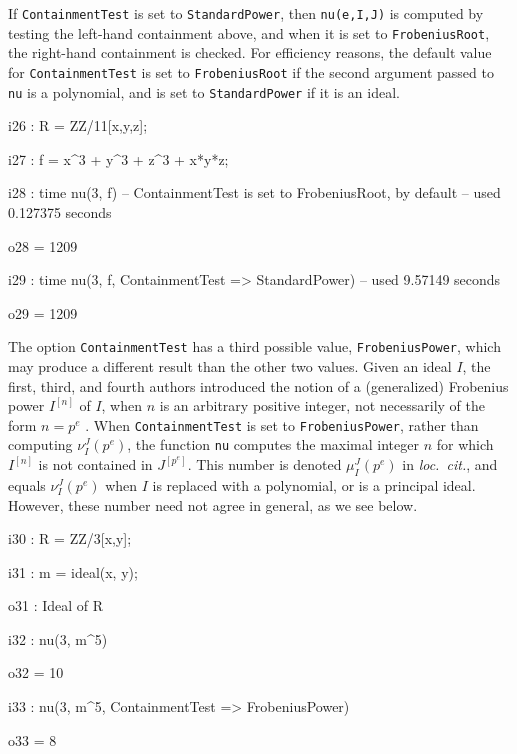 \documentclass{amsart}
\begin{document}
If \texttt{ContainmentTest} is set to \texttt{StandardPower}, then \texttt{nu(e,I,J)} is computed by testing the left-hand containment above, and when it is set to \texttt{FrobeniusRoot}, the right-hand containment is checked.
For efficiency reasons, the default value for \texttt{ContainmentTest} is set to  \texttt{FrobeniusRoot} if the second argument passed to \texttt{nu} is a polynomial, and is set to \texttt{StandardPower} if it is an ideal.

\bigskip
{\small
{}
\begin{MyVerbatim}
i26 : R = ZZ/11[x,y,z];

i27 : f = x^3 + y^3 + z^3 + x*y*z;

i28 : time nu(3, f) -- ContainmentTest is set to FrobeniusRoot, by default
     -- used 0.127375 seconds

o28 = 1209

i29 : time nu(3, f, ContainmentTest => StandardPower)
     -- used 9.57149 seconds

o29 = 1209
\end{MyVerbatim}
}
\bigskip


The option \texttt{ContainmentTest} has a third possible value, \texttt{FrobeniusPower}, which may produce a different result than the other two values.
Given an ideal $I$, the first, third, and fourth authors introduced the notion of a (generalized) Frobenius power $I^{[n]}$ of $I$, when $n$ is an arbitrary positive integer, not necessarily of the form $n = p^e$ \cite{hernandez+etal.frobenius_powers}.
When \texttt{ContainmentTest} is set to \texttt{FrobeniusPower}, rather than  computing $\nu_I^J(p^e)$, the function \texttt{nu} computes the maximal integer $n$ for which $I^{[n]}$ is not contained in $J^{[p^e]}$.  This number is denoted $\mu_I^J(p^e)$ in \emph{loc.\ cit.}, and equals $\nu_I^J(p^e)$ when $I$ is replaced with a polynomial, or is a principal ideal.  However, these number need not agree in general, as we see below.

\bigskip
{\small
{}
\begin{MyVerbatim}
i30 : R = ZZ/3[x,y];

i31 : m = ideal(x, y);

o31 : Ideal of R

i32 : nu(3, m^5)

o32 = 10

i33 : nu(3, m^5, ContainmentTest => FrobeniusPower)

o33 = 8
\end{MyVerbatim}
}
\bigskip
\end{document}
